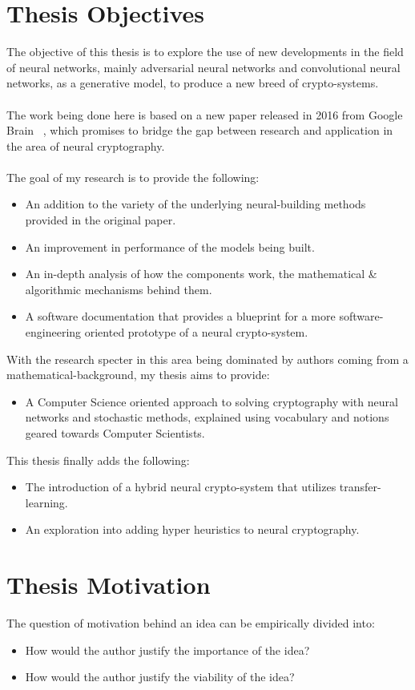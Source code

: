 \documentclass[a4paper, 12pt]{report}
\begin{document}
\section{\textbf{Thesis Objectives}}
The objective of this thesis is to explore the use of new developments in the field of neural networks, mainly adversarial neural networks and convolutional neural networks, as a generative model, to produce a new breed of crypto-systems.\\\\
The work being done here is based on a new paper released in 2016 from Google Brain ~\citep{DBLP:journals/corr/AbadiA16}, which promises to bridge the gap between research and application in the area of neural cryptography.\\\\
The goal of my research is to provide the following:
\begin{itemize}
	\item An addition to the variety of the underlying neural-building methods provided in the original paper.
	\item An improvement in performance of the models being built.
	\item An in-depth analysis of how the components work, the mathematical \&  algorithmic mechanisms behind them.
	\item A software documentation that provides a blueprint for a more software-engineering oriented prototype of a neural crypto-system.
\end{itemize}
With the research specter in this area being dominated by authors coming from a mathematical-background, my thesis aims to provide:
\begin{itemize}
	\item A Computer Science oriented approach to solving cryptography with neural networks and stochastic methods, explained using vocabulary and notions geared towards Computer Scientists.
\end{itemize}
This thesis finally adds the following:
\begin{itemize}
	\item The introduction of a hybrid neural crypto-system that utilizes transfer-learning.\citep{5288526}
	\item An exploration into adding hyper heuristics to neural cryptography.
\end{itemize}
\newpage
\section{\textbf{Thesis Motivation}}
The question of motivation behind an idea can be empirically divided into:
\begin{itemize}[nosep]
	\item How would the author justify the importance of the idea?
	\item How would the author justify the viability of the idea?
\end{itemize}
\end{document}
